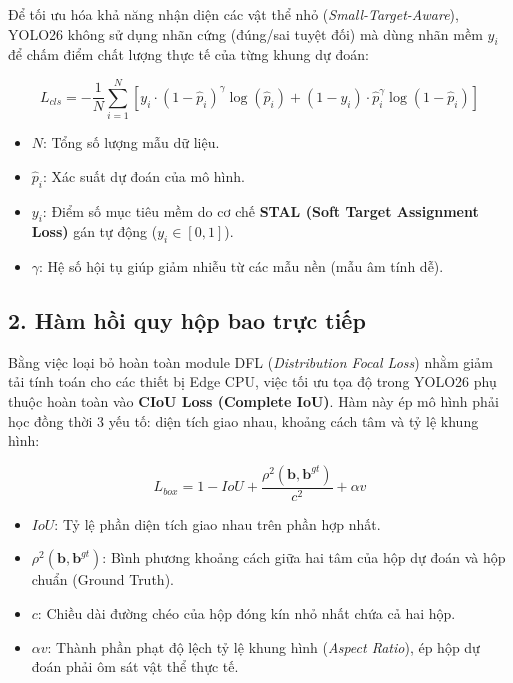 Để tối ưu hóa khả năng nhận diện các vật thể nhỏ (\textit{Small-Target-Aware}), YOLO26 không sử dụng nhãn cứng (đúng/sai tuyệt đối) mà dùng nhãn mềm $y_i$ để chấm điểm chất lượng thực tế của từng khung dự đoán:

\begin{equation}
L_{cls} = - \frac{1}{N} \sum_{i=1}^{N} \left[ y_i \cdot (1 - \hat{p}_i)^\gamma \log(\hat{p}_i) + (1 - y_i) \cdot \hat{p}_i^\gamma \log(1 - \hat{p}_i) \right]
\end{equation}

\begin{itemize}
    \item $N$: Tổng số lượng mẫu dữ liệu.
    \item $\hat{p}_i$: Xác suất dự đoán của mô hình.
    \item $y_i$: Điểm số mục tiêu mềm do cơ chế \textbf{STAL (Soft Target Assignment Loss)} gán tự động ($y_i \in [0, 1]$).
    \item $\gamma$: Hệ số hội tụ giúp giảm nhiễu từ các mẫu nền (mẫu âm tính dễ).
\end{itemize}

\subsection*{2. Hàm hồi quy hộp bao trực tiếp}

Bằng việc loại bỏ hoàn toàn module DFL (\textit{Distribution Focal Loss}) nhằm giảm tải tính toán cho các thiết bị Edge CPU, việc tối ưu tọa độ trong YOLO26 phụ thuộc hoàn toàn vào \textbf{CIoU Loss (Complete IoU)}. Hàm này ép mô hình phải học đồng thời 3 yếu tố: diện tích giao nhau, khoảng cách tâm và tỷ lệ khung hình:

\begin{equation}
L_{box} = 1 - IoU + \frac{\rho^2(\mathbf{b}, \mathbf{b}^{gt})}{c^2} + \alpha v
\end{equation}

\begin{itemize}
    \item $IoU$: Tỷ lệ phần diện tích giao nhau trên phần hợp nhất.
    \item $\rho^2(\mathbf{b}, \mathbf{b}^{gt})$: Bình phương khoảng cách giữa hai tâm của hộp dự đoán và hộp chuẩn (Ground Truth).
    \item $c$: Chiều dài đường chéo của hộp đóng kín nhỏ nhất chứa cả hai hộp.
    \item $\alpha v$: Thành phần phạt độ lệch tỷ lệ khung hình (\textit{Aspect Ratio}), ép hộp dự đoán phải ôm sát vật thể thực tế.
\end{itemize}

